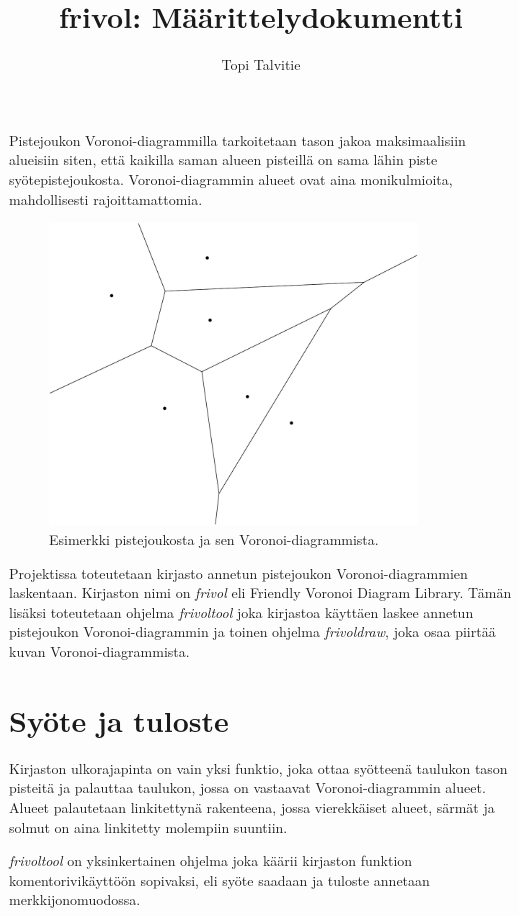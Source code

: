 \documentclass[a4paper, 11pt, finnish]{article}
\author{Topi Talvitie}
\title{frivol: Määrittelydokumentti}
\begin{document}
\maketitle

Pistejoukon Voronoi-diagrammilla tarkoitetaan tason jakoa maksimaalisiin alueisiin siten, että kaikilla saman alueen pisteillä on sama lähin piste syötepistejoukosta. Voronoi-diagrammin alueet ovat aina monikulmioita, mahdollisesti rajoittamattomia.

\begin{figure}[h]
\centering
\includegraphics[height=8cm]{esim-crop}
\caption{Esimerkki pistejoukosta ja sen Voronoi-diagrammista.}
\end{figure}

Projektissa toteutetaan kirjasto annetun pistejoukon Voronoi-diagrammien laskentaan. Kirjaston nimi on \emph{frivol} eli Friendly Voronoi Diagram Library. Tämän lisäksi toteutetaan ohjelma \emph{frivoltool} joka kirjastoa käyttäen laskee annetun pistejoukon Voronoi-diagrammin ja toinen ohjelma \emph{frivoldraw}, joka osaa piirtää kuvan Voronoi-diagrammista.

\section*{Syöte ja tuloste}
Kirjaston ulkorajapinta on vain yksi funktio, joka ottaa syötteenä taulukon tason pisteitä ja palauttaa taulukon, jossa on vastaavat Voronoi-diagrammin alueet. Alueet palautetaan linkitettynä rakenteena, jossa vierekkäiset alueet, särmät ja solmut on aina linkitetty molempiin suuntiin.

\emph{frivoltool} on yksinkertainen ohjelma joka käärii kirjaston funktion komentorivikäyttöön sopivaksi, eli syöte saadaan ja tuloste annetaan merkkijonomuodossa.
\end{document}

